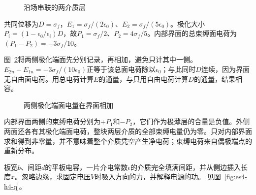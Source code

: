 \begin{figure}[H]\centering
{}
\caption{沿场串联的两介质层}\label{fig:es4-h3-q}
\end{figure}
\begin{solution}
共同位移为$D=\sigma_f$，$E_1=\sigma_f/(2\epsilon_0)$、$E_2=\sigma_f/(5\epsilon_0)$。极化大小$P_i=(1-\epsilon_0/\epsilon_i)D$，故$P_1=\sigma_f/2$、$P_2=4\sigma_f/5$。内部界面的总束缚面电荷为$(P_1-P_2)=-3\sigma_f/10$。

图~\ref{fig:es4-h3-s}将两侧极化端面先分别记录，再相加，避免只计其中一侧。$E_{2n}-E_{1n}=-3\sigma_f/(10\epsilon_0)$正等于该总面电荷除以$\epsilon_0$；与此同时$D$连续，因为界面无自由面电荷。用总电荷计算$E$的通量，与只用自由电荷计算$D$的通量，结果相容。
\begin{figure}[H]\centering
{}
\caption{两侧极化端面电量在界面相加}\label{fig:es4-h3-s}
\end{figure}


内部界面两侧的束缚电荷分别为$+P_1$和$-P_2$，它们作为极薄层的合量是负值。外侧两面还各有其极化端面电荷，整块两层介质的全部束缚电量仍为零。只对内部界面求和得到非零量，并不意味着整个介质凭空产生净电荷；束缚电荷来自偶极端点的重新分布。
\end{solution}

\begin{exercise}[介质插入平板的横向力]\label{ex:es4-h4}
板宽$b$、间距$d$的平板电容，一片介电常数$\epsilon$的介质完全填满间距，并从侧边插入长度$x$。忽略边缘，求固定电压$V$时吸入方向的力，并解释电源的功。 见图~\ref{fig:es4-h4-q}。
\end{exercise}

